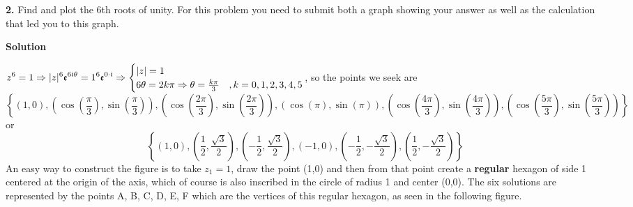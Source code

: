 \documentclass[10.5pt]{amsart}
\newcommand{\dsp}{\displaystyle}
\begin{document}
\textbf{2.} Find and plot the 6th roots of unity. For this problem you need to submit both 
a graph showing your 
answer as well as the calculation that led you to this graph. 
\begin{center}
 \textbf{Solution}
\end{center}
$\dsp z^6=1\Rightarrow |z|^{6}\mathfrak{e}^{6\mi\theta}=1^{6}\mathfrak{e}^{0\cdot\mi}\Rightarrow 
\begin{cases}|z|=1&\\6\theta=2k\pi\Rightarrow 
\theta=\frac{k\pi}{3}&,k=0,1,2,3,4,5\end{cases}$, so the points we 
seek are
\[
\left\{(1,0),\left(\cos\left(\frac{\pi}{3}\right),\sin\left(\frac{\pi}{3}\right)\right),
\left(\cos\left(\frac{2\pi}{3}\right),\sin\left(\frac{2\pi}{3}\right)\right),
\left(\cos\left(\pi\right) 
,\sin\left(\pi\right)\right),\left(\cos\left(\frac{4\pi}{3}\right),
\sin\left(\frac{4\pi}{3}\right)\right),\left(\cos\left(\frac{5\pi}{3}\right),
\sin\left(\frac{5\pi}{3}
 \right)\right)\right\}
\]
or 
\[
 \left\{(1,0),\left(\frac{1}{2},\frac{\sqrt{3}}{2}\right),\left(-\frac{1}{2},\frac{\sqrt{3}}{2}\right),(-1,0),
 \left(-\frac{1}{2},-\frac{\sqrt{3}}{2}\right),\left(\frac{1}{2},-\frac{\sqrt{3}}{2}\right)\right\}
\]
An easy way to construct the figure is to take $z_1=1$, draw the point (1,0) and then from that point create a 
\textbf{regular} hexagon of side 1 centered at the origin of the axis, which of course is 
also inscribed in the circle of radius 1 and center (0,0). The six solutions are 
represented by the  points A, B, C, D, E, F which are 
the vertices of this regular hexagon, as seen in the following figure.
\end{document}
